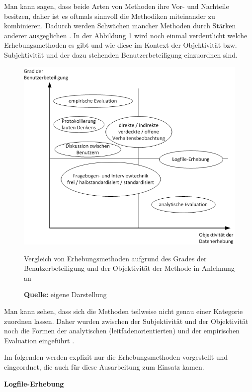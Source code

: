 Man kann sagen, dass beide Arten von Methoden ihre Vor- und Nachteile besitzen, daher ist es oftmals sinnvoll die Methodiken miteinander zu kombinieren. Dadurch werden Schwächen mancher Methoden durch Stärken anderer ausgeglichen \citep[vgl.][261]{Pruemper1997}. In der Abbildung \ref{fig:erhebungsmethodenObjektivitaetBenutzerbeteiligung} wird noch einmal verdeutlicht welche Erhebungsmethoden es gibt und wie diese im Kontext der Objektivität bzw. Subjektivität und der dazu stehenden Benutzerbeteiligung einzuordnen sind.
\begin{figure}[H]
  \centering
  \includegraphics[scale=0.8]{img/Datenerhebungsmethoden_Objektivitaet_Benutzerbeteiligung.png}
  \caption{Vergleich von Erhebungsmethoden aufgrund des Grades der Benutzerbeteiligung und der Objektivität der Methode in Anlehnung an \citep[16]{Hegner2003}}
  \caption*{\textbf{Quelle:} eigene Darstellung}
  \label{fig:erhebungsmethodenObjektivitaetBenutzerbeteiligung}
\end{figure}
Man kann sehen, dass sich die Methoden teilweise nicht genau einer Kategorie zuordnen lassen. Daher wurden zwischen der Subjektivität und der Objektivität noch die Formen der analytischen (leitfadenorientierten) und der empirischen Evaluation eingeführt \citep[vgl.][15]{Hegner2003}.


Im folgenden werden explizit nur die Erhebungsmethoden vorgestellt und eingeordnet, die auch für diese Ausarbeitung zum Einsatz kamen.

\textbf{Logfile-Erhebung}

